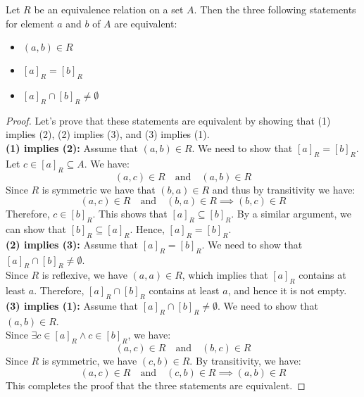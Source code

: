\begin{theorem}
    Let $R$ be an equivalence relation on a set $A$. Then the three following statements for element $a$ and $b$ of $A$ are equivalent:
    \begin{itemize}[itemsep=1pt,label=$\circ$]
        \item $(a,b) \in R$
        \item $[a]_R = [b]_R$
        \item $[a]_R \cap [b]_R \neq \emptyset$
    \end{itemize}
\end{theorem}
\begin{proof}
    Let's prove that these statements are equivalent by showing that (1) implies (2), (2) implies (3), and (3) implies (1). \\
    \textbf{(1) implies (2):} Assume that $(a,b) \in R$. We need to show that $[a]_R = [b]_R$. \\
    Let $c \in [a]_R \subseteq A$. We have:
    \[
        (a, c) \in R \quad \text{and} \quad (a,b) \in R
    \]
    Since $R$ is symmetric we have that $(b,a) \in R$ and thus by transitivity we have:
    \[
        (a,c) \in R \quad \text{and} \quad (b,a) \in R \implies (b,c) \in R
    \]
    Therefore, $c \in [b]_R$. This shows that $[a]_R \subseteq [b]_R$. By a similar argument, we can show that $[b]_R \subseteq [a]_R$. Hence, $[a]_R = [b]_R$. \\
    \textbf{(2) implies (3):} Assume that $[a]_R = [b]_R$. We need to show that $[a]_R \cap [b]_R \neq \emptyset$. \\
    Since $R$ is reflexive, we have $(a,a) \in R$, which implies that $[a]_R$ contains at least $a$. Therefore, $[a]_R \cap [b]_R$ contains at least $a$, and hence it is not empty. \\
    \textbf{(3) implies (1):} Assume that $[a]_R \cap [b]_R \neq \emptyset$. We need to show that $(a,b) \in R$. \\
    Since $\exists c \in [a]_R \land c \in [b]_R$, we have:
    \[
        (a,c) \in R \quad \text{and} \quad (b,c) \in R
    \]
    Since $R$ is symmetric, we have $(c,b) \in R$. By transitivity, we have:
    \[
        (a,c) \in R \quad \text{and} \quad (c,b) \in R \implies (a,b) \in R
    \]
    This completes the proof that the three statements are equivalent.
\end{proof}

